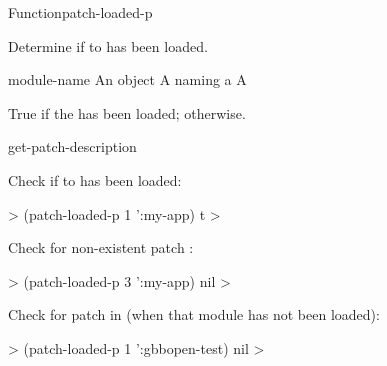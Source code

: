 \documentclass[10pt,twoside,english,pdftex]{article}
\begin{document}

\begin{functiondoc}{Function}{patch-loaded-p}%
  {
    \returns{} }
%
%

\fnsyntax 

\fnpurpose Determine if   to  has
been loaded.

\fnpackage {}

\fnmodule {}

\fnargs
\begin{args}{module-name}
\arg[id] An object
 A  naming a 
\arg[boolean] A 
\end{args}

\fnreturns True if the  has been loaded; \nil{} otherwise.

\fnerrors
\modulenotdefined

\begin{alsos}{get-patch-description}
\also[patch]
\end{alsos}

\fnexamples
%
Check if   to   has
been loaded:
%
\W\supp
\begin{example}
  > (patch-loaded-p 1 ':my-app)
  t
  >
\end{example}

Check for non-existent patch :
%
\W\supp
\begin{example}
  > (patch-loaded-p 3 ':my-app)
  nil
  >
\end{example}

Check for patch  in   (when
that module has not been loaded):
%
\W\supp
\begin{example}
  > (patch-loaded-p 1 ':gbbopen-test)
  nil
  >
\end{example}

\end{functiondoc}

\end{document}
